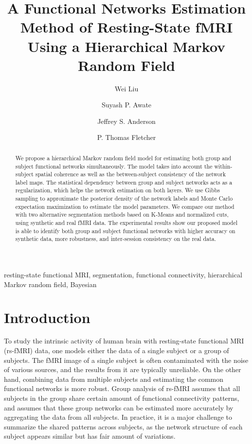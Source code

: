 \documentclass[review,authoryear]{elsarticle}
\begin{document}
\begin{frontmatter}
  \title{A Functional Networks Estimation Method of Resting-State fMRI Using a
    Hierarchical Markov Random Field}

  \author[sci]{Wei Liu}

  \author[sci]{Suyash P. Awate}

  \author[rad]{Jeffrey S. Anderson}

  \author[sci]{P. Thomas Fletcher}

  \address[sci]{Scientific Computing and Imaging Institute, University of
  Utah, USA}

  \address[rad]{Department of Radiology, University of Utah, USA}

  \begin{abstract}
  We propose a hierarchical Markov random field model for estimating both group
  and subject functional networks simultaneously. The model takes into account
  the within-subject spatial coherence as well as the between-subject
  consistency of the network label maps. The statistical dependency between
  group and subject networks acts as a regularization, which helps the network
  estimation on both layers. We use Gibbs sampling to approximate the posterior
  density of the network labels and Monte Carlo expectation maximization to
  estimate the model parameters. We compare our method with two alternative
  segmentation methods based on K-Means and normalized cuts, using synthetic and
  real fMRI data. The experimental results show our proposed model is able to
  identify both group and subject functional networks with higher accuracy on
  synthetic data, more robustness, and inter-session consistency on the real
  data.
  \end{abstract}

  \begin{keyword}
    resting-state functional MRI, segmentation, functional connectivity,
    hierarchical Markov random field, Bayesian
  \end{keyword}
\end{frontmatter}

\section{Introduction}
To study the intrinsic activity of human brain with resting-state functional MRI
(rs-fMRI) data, one models either the data of a single subject or a group of
subjects. The fMRI image of a single subject is often contaminated with the
noise of various sources, and the results from it are typically unreliable.  On
the other hand, combining data from multiple subjects and estimating the
common functional networks is more robust. Group analysis of rs-fMRI assumes
that all subjects in the group share certain amount of functional connectivity
patterns, and assumes that these group networks can be estimated more accurately
by aggregating the data from all subjects. In practice, it is a major challenge
to summarize the shared patterns across subjects, as the network structure of
each subject appears similar but has fair amount of variations.
\end{document}
